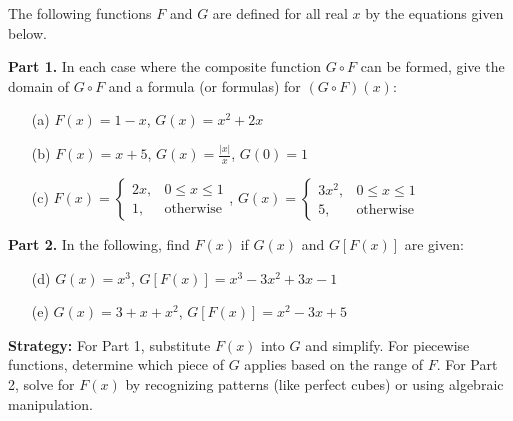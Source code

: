 \begin{problembox}
\begin{problemstatement}
The following functions \( F \) and \( G \) are defined for all real \( x \) by the equations given below. 

\textbf{Part 1.} In each case where the composite function \( G \circ F \) can be formed, give the domain of \( G \circ F \) and a formula (or formulas) for \( (G \circ F)(x) \):
\begin{itemize}
\item[(a)] \( F(x) = 1 - x \), \quad \( G(x) = x^2 + 2x \)
\item[(b)] \( F(x) = x + 5 \), \quad \( G(x) = \frac{|x|}{x} \), \( G(0) = 1 \)
\item[(c)] \( F(x) = \begin{cases} 2x, & 0 \le x \le 1 \\ 1, & \text{otherwise} \end{cases} \),  
\( G(x) = \begin{cases} 3x^2, & 0 \le x \le 1 \\ 5, & \text{otherwise} \end{cases} \)
\end{itemize}
\textbf{Part 2.} In the following, find \( F(x) \) if \( G(x) \) and \( G[F(x)] \) are given:
\begin{itemize}
\item[(d)] \( G(x) = x^3 \), \quad \( G[F(x)] = x^3 - 3x^2 + 3x - 1 \)
\item[(e)] \( G(x) = 3 + x + x^2 \), \quad \( G[F(x)] = x^2 - 3x + 5 \)
\end{itemize}
\end{problemstatement}
\end{problembox}

\noindent\textbf{Strategy:} For Part 1, substitute $F(x)$ into $G$ and simplify. For piecewise functions, determine which piece of $G$ applies based on the range of $F$. For Part 2, solve for $F(x)$ by recognizing patterns (like perfect cubes) or using algebraic manipulation.

